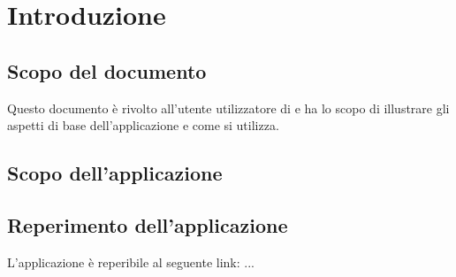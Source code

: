 \section{Introduzione} \label{intro}

    \subsection{Scopo del documento}

        Questo documento è rivolto all’utente utilizzatore di \ProjectName{} e ha lo scopo di illustrare gli aspetti di base dell'applicazione  
        e come si utilizza.

    \subsection{Scopo dell'applicazione}

        \ScopoProdotto{}

	\subsection{Reperimento dell'applicazione} \label{reperimentoapp}

    	L'applicazione \ProjectName{} è reperibile al seguente link: ...
